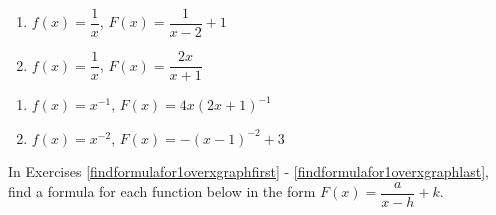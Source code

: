 \documentclass{ximera}
\begin{document}
\begin{multicols}{2}
\begin{enumerate}
\setcounter{enumi}{\value{HW}}
\item $f(x) = \dfrac{1}{x}$,  $F(x) = \dfrac{1}{x-2}+1$ \label{rationaltransfirst}
\item $f(x) =\dfrac{1}{x}$, $F(x) = \dfrac{2x}{x+1}$

\setcounter{HW}{\value{enumi}}
\end{enumerate}
\end{multicols}

\begin{multicols}{2}
\begin{enumerate}
\setcounter{enumi}{\value{HW}}

\item $f(x) =x^{-1}$, $F(x)=4x(2x+1)^{-1}$
\item $f(x) = x^{-2}$, $F(x)=-(x-1)^{-2}+3$  \label{rationaltranslast}

\setcounter{HW}{\value{enumi}}
\end{enumerate}
\end{multicols}


In Exercises \ref{findformulafor1overxgraphfirst} - \ref{findformulafor1overxgraphlast}, find a formula for each function below in the form $F(x) = \dfrac{a}{x-h}+k$.
\end{document}
